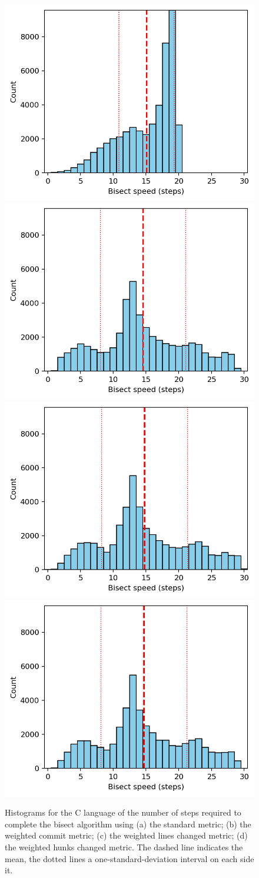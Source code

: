 \documentclass[pdflatex, sn-mathphys, referee]{sn-jnl}%
\theoremstyle{thmstyleone}%
\theoremstyle{thmstyletwo}%
\theoremstyle{thmstylethree}%
\theoremstyle{thmstyleone}
\begin{document}
\begin{figure}[ht]
\centering
\includegraphics[width=0.45\columnwidth]{Fig7}%
\hfil
\includegraphics[width=0.45\columnwidth]{Fig8}%
\hfil
\includegraphics[width=0.45\columnwidth]{Fig9}%
\hfil
\includegraphics[width=0.45\columnwidth]{Fig10}%
\caption{\label{fig:c-bisect}Histograms for the C language of the number of steps required to complete the bisect algorithm using (a) the standard metric; (b) the weighted commit metric; (c) the weighted lines changed metric; (d) the weighted hunks changed metric. The dashed line indicates the mean, the dotted lines a one-standard-deviation interval on each side it.}
\end{figure}
\end{document}
